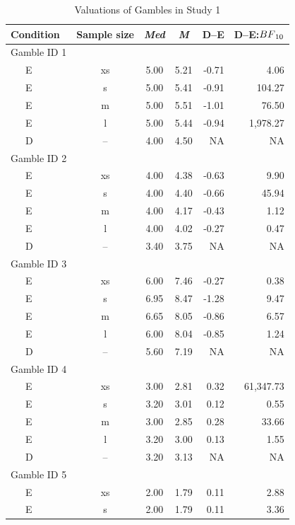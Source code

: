 \documentclass[a4paper, man, floatsintext]{apa6}
\begin{document}
\begin{table}[tbp]
\begin{center}
\begin{threeparttable}
\caption{\label{tab:meansStudy1}Valuations of Gambles in Study 1}
\begin{tabular}{lcccrr}
\toprule
Condition & Sample size & \textit{Med} & \textit{M} & D--E & D--E:$BF\textsubscript{10}$\\
\midrule
Gamble ID 1 &  &  &  &  & \\
\ \ \ E & xs & 5.00 & 5.21 & -0.71 & 4.06\\
\ \ \ E & s & 5.00 & 5.41 & -0.91 & 104.27\\
\ \ \ E & m & 5.00 & 5.51 & -1.01 & 76.50\\
\ \ \ E & l & 5.00 & 5.44 & -0.94 & 1,978.27\\
\ \ \ D & -- & 4.00 & 4.50 & NA & NA\\
Gamble ID 2 &  &  &  &  & \\
\ \ \ E & xs & 4.00 & 4.38 & -0.63 & 9.90\\
\ \ \ E & s & 4.00 & 4.40 & -0.66 & 45.94\\
\ \ \ E & m & 4.00 & 4.17 & -0.43 & 1.12\\
\ \ \ E & l & 4.00 & 4.02 & -0.27 & 0.47\\
\ \ \ D & -- & 3.40 & 3.75 & NA & NA\\
Gamble ID 3 &  &  &  &  & \\
\ \ \ E & xs & 6.00 & 7.46 & -0.27 & 0.38\\
\ \ \ E & s & 6.95 & 8.47 & -1.28 & 9.47\\
\ \ \ E & m & 6.65 & 8.05 & -0.86 & 6.57\\
\ \ \ E & l & 6.00 & 8.04 & -0.85 & 1.24\\
\ \ \ D & -- & 5.60 & 7.19 & NA & NA\\
Gamble ID 4 &  &  &  &  & \\
\ \ \ E & xs & 3.00 & 2.81 & 0.32 & 61,347.73\\
\ \ \ E & s & 3.20 & 3.01 & 0.12 & 0.55\\
\ \ \ E & m & 3.00 & 2.85 & 0.28 & 33.66\\
\ \ \ E & l & 3.20 & 3.00 & 0.13 & 1.55\\
\ \ \ D & -- & 3.20 & 3.13 & NA & NA\\
Gamble ID 5 &  &  &  &  & \\
\ \ \ E & xs & 2.00 & 1.79 & 0.11 & 2.88\\
\ \ \ E & s & 2.00 & 1.79 & 0.11 & 3.36\\

\end{tabular}
\end{threeparttable}
\end{center}
\end{table}
\end{document}
